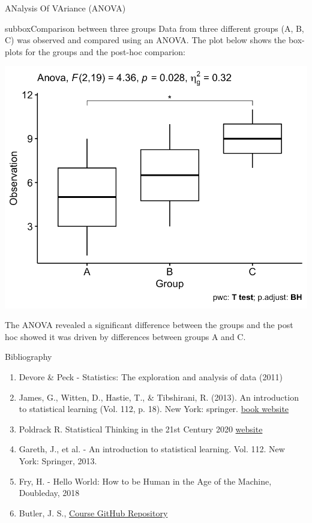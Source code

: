 \documentclass[10pt,a4paper]{article}
\begin{document}
\begin{multicols}{3}
\begin{textbox}{ANalysis Of VAriance (ANOVA)}
\begin{subbox}{subbox}{Comparison between three groups}
\tiny
Data from three different groups (A, B, C) was observed and compared using an ANOVA.
The plot below shows the box-plots for the groups and the post-hoc comparion:
\begin{center}
\includegraphics[width=\textwidth]{Figures/ANOVA/Picture1.png}
\end{center}
The ANOVA revealed a significant difference between the groups and the post hoc showed it was driven by differences between groups A and C.
\end{subbox}
\end{textbox}
\begin{textbox}{Bibliography}
\begin{enumerate}
\item 
Devore \& Peck  - Statistics: The exploration and analysis of data (2011)
\item James, G., Witten, D., Hastie, T., \& Tibshirani, R. (2013). An introduction to statistical learning (Vol. 112, p. 18). New York: springer. 
\href{https://www.statlearning.com}{book website}
\item Poldrack R. Statistical Thinking in the 21st Century 2020 \href{https://statsthinking21.github.io/statsthinking21-core-site/index.html}{website}
\item
Gareth, J., et al. - An introduction to statistical learning. Vol. 112. New York: Springer, 2013.
\item
Fry, H. - Hello World: How to be Human in the Age of the Machine, Doubleday, 2018
\item Butler, J. S., \href{https://github.com/john-s-butler-dit/Probability_and_Statistical_Inference}{Course GitHub Repository}  

\end{enumerate}


\end{textbox}

\end{multicols}
\end{document}
